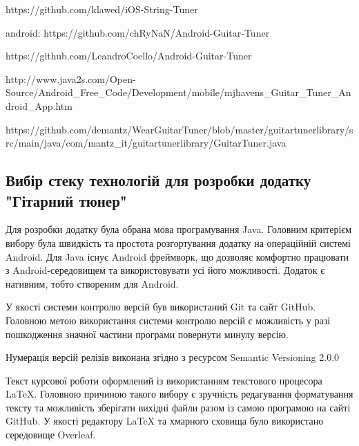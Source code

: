 https://github.com/klawed/iOS-String-Tuner

android:
https://github.com/chRyNaN/Android-Guitar-Tuner

https://github.com/LeandroCoello/Android-Guitar-Tuner

http://www.java2s.com/Open-Source/Android_Free_Code/Development/mobile/mjhavens_Guitar_Tuner_Android_App.htm

https://github.com/demantz/WearGuitarTuner/blob/master/guitartunerlibrary/src/main/java/com/mantz_it/guitartunerlibrary/GuitarTuner.java

\subsection{Вибір стеку технологій для розробки додатку "Гітарний тюнер"}

Для розробки додатку була обрана мова програмування Java. Головним критерієм вибору була швидкість та простота розгортування додатку на операційній системі Android. Для Java існує Android фреймворк, що дозволяє комфортно працювати з Android-середовищем та використовувати усі його можливості. Додаток є нативним, тобто створеним для Android. 

У якості системи контролю версій був використаний Git та сайт GitHub. Головною метою використання системи контролю версій є можливість у разі пошкодження значної частини програми повернути минулу версію.

Нумерація версій релізів виконана згідно з ресурсом Semantic Versioning 2.0.0 \cite{preston-werner}

Текст курсової роботи оформлений із використанням текстового процесора LaTeX. Головною причиною такого вибору є зручність редагування форматування тексту та можливість зберігати вихідні файли разом із самою програмою на сайті GitHub. У якості редактору LaTeX та хмарного сховища було використано середовище Overleaf.
